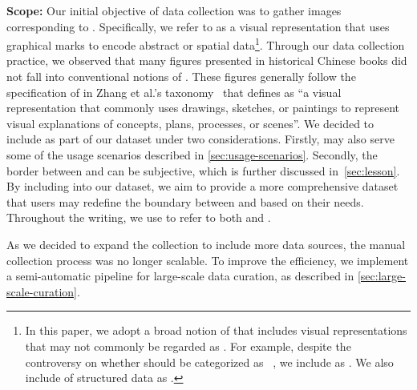 {\textbf{Scope:}
Our initial objective of data collection was to gather images corresponding to .
Specifically, we refer to  as a visual representation that uses graphical marks to encode abstract or spatial data\footnote{
    In this paper, we adopt a broad notion of  that includes visual representations that may not commonly be regarded as .
    For example, despite the controversy on whether  should be categorized as ~\cite{Hograefer2020State,Friendly2010First,Chen2024Image,Zhang2025VisTaxa}, we include  as .
    We also include  of structured data as .
}.
Through our data collection practice, we observed that many figures presented in historical Chinese books did not fall into conventional notions of .
These  figures generally follow the specification of  in Zhang et al.'s taxonomy~\cite{Zhang2025VisTaxa} that defines  as ``a visual representation that commonly uses drawings, sketches, or paintings to represent visual explanations of concepts, plans, processes, or scenes''.
We decided to include  as part of our dataset under two considerations.
Firstly,  may also serve some of the usage scenarios described in \cref{sec:usage-scenarios}.
Secondly, the border between  and  can be subjective, which is further discussed in~\cref{sec:lesson}.
By including  into our dataset, we aim to provide a more comprehensive dataset that users may redefine the boundary between  and  based on their needs.
Throughout the writing, we use  to refer to both  and .

As we decided to expand the collection to include more data sources, the manual collection process was no longer scalable.
To improve the efficiency, we implement a semi-automatic pipeline for large-scale data curation, as described in \cref{sec:large-scale-curation}.
}




